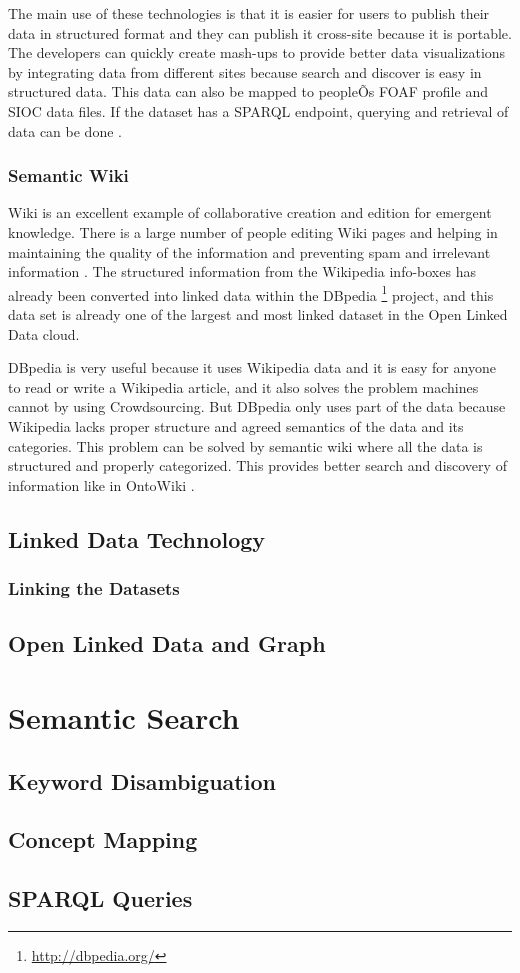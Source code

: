 The main use of these technologies is that it is easier for users to publish their data in structured format and they can publish it cross-site because it is portable. The developers can quickly create mash-ups to provide better data visualizations by integrating data from different sites because search and discover is easy in structured data. This data can also be mapped to peopleÕs FOAF profile and SIOC data files. If the dataset has a SPARQL endpoint, querying and retrieval of data can be done \cite{millard2010consuming}.

\subsubsection{Semantic Wiki}

Wiki is an excellent example of collaborative creation and edition for emergent knowledge. There is a large number of people editing Wiki pages and helping in maintaining the quality of the information and preventing spam and irrelevant information \cite{chi2009augmented}. The structured information from the Wikipedia info-boxes has already been converted into linked data within the DBpedia \footnote{\url{http://dbpedia.org/}} project, and this data set is already one of the largest and most linked dataset in the Open Linked Data cloud.

DBpedia is very useful because it uses Wikipedia data and it is easy for anyone to read or write a Wikipedia article, and it also solves the problem machines cannot by using Crowdsourcing. But DBpedia only uses part of the data because Wikipedia lacks proper structure and agreed semantics of the data and its categories. This problem can be solved by semantic wiki where all the data is structured and properly categorized. This provides better search and discovery of information like in OntoWiki \cite{Albors2008}.

\subsection{Linked Data Technology}


\subsubsection{Linking the Datasets}
\subsection{Open Linked Data and Graph}

\section{Semantic Search}
\subsection{Keyword Disambiguation}
\subsection{Concept Mapping}
\subsection{SPARQL Queries}